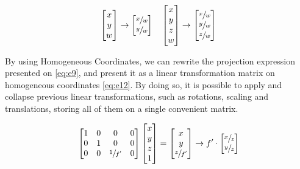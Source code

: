 \documentclass{article}
\begin{document}
\begin{alignat}{2}
\begin{bmatrix}
x  \\
y  \\
w
\end{bmatrix} \rightarrow
\begin{bmatrix}
\sfrac{x}{w}  \\
\sfrac{y}{w}  \\
\end{bmatrix} \quad
\begin{bmatrix}
x  \\
y  \\
z  \\
w
\end{bmatrix} \rightarrow
\begin{bmatrix}
\sfrac{x}{w}  \\
\sfrac{y}{w}  \\
\sfrac{z}{w}
\end{bmatrix} \label{eq:e11}
\end{alignat}

By using Homogeneous Coordinates, we can rewrite the projection expression presented on \eqref{eq:e9}, and present it as a linear transformation matrix on homogeneous coordinates \eqref{eq:e12}. By doing so, it is possible to apply and collapse previous linear transformations, such as rotations, scaling and translations, storing all of them on a single convenient matrix. 

\begin{alignat}{2}
\begin{bmatrix}
1 & 0 & 0 & 0  \\
0 & 1 & 0 & 0  \\
0 & 0 & \sfrac{1}{f'} & 0
\end{bmatrix}
\begin{bmatrix}
x  \\
y  \\
z \\
1
\end{bmatrix} =
\begin{bmatrix}
x  \\
y  \\
\sfrac{z}{f'}
\end{bmatrix} \rightarrow
f' \cdot \begin{bmatrix}
\sfrac{x}{z}  \\
\sfrac{y}{z}
\end{bmatrix} \label{eq:e12}
\end{alignat}
\end{document}

